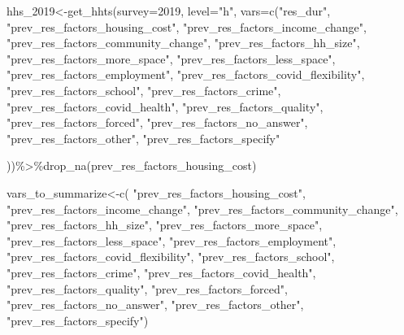 \documentclass[
]{article}
\newenvironment{Shaded}{\begin{snugshade}}{\end{snugshade}}
\newcommand{\AttributeTok}[1]{\textcolor[rgb]{0.77,0.63,0.00}{#1}}
\newcommand{\FunctionTok}[1]{\textcolor[rgb]{0.00,0.00,0.00}{#1}}
\newcommand{\NormalTok}[1]{#1}
\newcommand{\OtherTok}[1]{\textcolor[rgb]{0.56,0.35,0.01}{#1}}
\newcommand{\SpecialCharTok}[1]{\textcolor[rgb]{0.00,0.00,0.00}{#1}}
\newcommand{\StringTok}[1]{\textcolor[rgb]{0.31,0.60,0.02}{#1}}
\begin{document}
\begin{Shaded}
\begin{Highlighting}[]
\NormalTok{hhs\_2019}\OtherTok{\textless{}{-}}\FunctionTok{get\_hhts}\NormalTok{(}\AttributeTok{survey=}\StringTok{\textquotesingle{}2019\textquotesingle{}}\NormalTok{, }\AttributeTok{level=}\StringTok{"h"}\NormalTok{, }\AttributeTok{vars=}\FunctionTok{c}\NormalTok{(}\StringTok{"res\_dur"}\NormalTok{,}
\StringTok{"prev\_res\_factors\_housing\_cost"}\NormalTok{,}
\StringTok{"prev\_res\_factors\_income\_change"}\NormalTok{,}
\StringTok{"prev\_res\_factors\_community\_change"}\NormalTok{,}
\StringTok{"prev\_res\_factors\_hh\_size"}\NormalTok{,}
\StringTok{"prev\_res\_factors\_more\_space"}\NormalTok{,}
\StringTok{"prev\_res\_factors\_less\_space"}\NormalTok{,}
\StringTok{"prev\_res\_factors\_employment"}\NormalTok{,}
\StringTok{"prev\_res\_factors\_covid\_flexibility"}\NormalTok{,}
\StringTok{"prev\_res\_factors\_school"}\NormalTok{,}
\StringTok{"prev\_res\_factors\_crime"}\NormalTok{,}
\StringTok{"prev\_res\_factors\_covid\_health"}\NormalTok{,}
\StringTok{"prev\_res\_factors\_quality"}\NormalTok{,}
\StringTok{"prev\_res\_factors\_forced"}\NormalTok{,}
\StringTok{"prev\_res\_factors\_no\_answer"}\NormalTok{,}
\StringTok{"prev\_res\_factors\_other"}\NormalTok{,}
\StringTok{"prev\_res\_factors\_specify"}

\NormalTok{))}\SpecialCharTok{\%\textgreater{}\%}\FunctionTok{drop\_na}\NormalTok{(prev\_res\_factors\_housing\_cost)}



\NormalTok{vars\_to\_summarize}\OtherTok{\textless{}{-}}\FunctionTok{c}\NormalTok{(}
\StringTok{"prev\_res\_factors\_housing\_cost"}\NormalTok{,}
\StringTok{"prev\_res\_factors\_income\_change"}\NormalTok{,}
\StringTok{"prev\_res\_factors\_community\_change"}\NormalTok{,}
\StringTok{"prev\_res\_factors\_hh\_size"}\NormalTok{,}
\StringTok{"prev\_res\_factors\_more\_space"}\NormalTok{,}
\StringTok{"prev\_res\_factors\_less\_space"}\NormalTok{,}
\StringTok{"prev\_res\_factors\_employment"}\NormalTok{,}
\StringTok{"prev\_res\_factors\_covid\_flexibility"}\NormalTok{,}
\StringTok{"prev\_res\_factors\_school"}\NormalTok{,}
\StringTok{"prev\_res\_factors\_crime"}\NormalTok{,}
\StringTok{"prev\_res\_factors\_covid\_health"}\NormalTok{,}
\StringTok{"prev\_res\_factors\_quality"}\NormalTok{,}
\StringTok{"prev\_res\_factors\_forced"}\NormalTok{,}
\StringTok{"prev\_res\_factors\_no\_answer"}\NormalTok{,}
\StringTok{"prev\_res\_factors\_other"}\NormalTok{,}
\StringTok{"prev\_res\_factors\_specify"}\NormalTok{)}





\end{Highlighting}
\end{Shaded}
\end{document}
